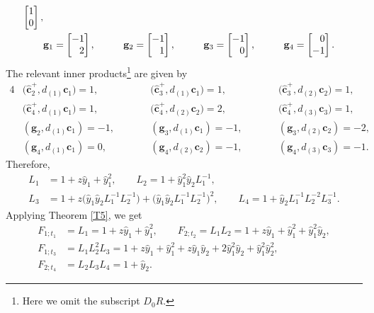\documentclass[10pt,a4paper]{amsart}
\numberwithin{equation}{section}
\begin{document}
\begin{Example}
\begin{alignat*}{5}
\begin{bmatrix}
 1\\0
 \end{bmatrix},&\\
 &\mathbf{g}_{1}=\begin{bmatrix}
 -1\\\hphantom{-}2
 \end{bmatrix},\qquad&&
 \mathbf{g}_{2}=\begin{bmatrix}
 -1\\\hphantom{-}1
 \end{bmatrix},\qquad&&
 \mathbf{g}_{3}=\begin{bmatrix}
 -1\\\hphantom{-}0
 \end{bmatrix},\qquad&&
 \mathbf{g}_{4}=\begin{bmatrix}
 \hphantom{-}0\\-1
 \end{bmatrix}.&
 \end{alignat*}
The relevant inner products\footnote{Here we omit the subscript $D_0R$.} are given by
\begin{alignat*}{4}
&\bigl(\mathbf{\hat{c}}_2^+,d_{(1)}\mathbf{c}_{1}\bigr)=1,\qquad &&\bigl(\mathbf{\hat{c}}_3^+,d_{(1)}\mathbf{c}_{1}\bigr)=1,\qquad && \bigl(\mathbf{\hat{c}}_3^+,d_{(2)}\mathbf{c}_{2}\bigr)=1,&\\
 &\bigl(\mathbf{\hat{c}}_4^+,d_{(1)}\mathbf{c}_{1}\bigr)=1,\qquad&&
 \bigl(\mathbf{\hat{c}}_4^+,d_{(2)}\mathbf{c}_{2}\bigr)=2,\qquad&&
\bigl(\mathbf{\hat{c}}_4^+,d_{(3)}\mathbf{c}_{3}\bigr)=1,&\\
 &(\mathbf{g}_{2},d_{(1)}\mathbf{c}_{1})=-1,\qquad&&
 (\mathbf{g}_{3},d_{(1)}\mathbf{c}_{1})=-1,\qquad&&
 (\mathbf{g}_{3},d_{(2)}\mathbf{c}_{2})=-2,&\\
 &(\mathbf{g}_{4},d_{(1)}\mathbf{c}_{1})=0,\qquad&&
 (\mathbf{g}_{4},d_{(2)}\mathbf{c}_{2})=-1,\qquad&&
 (\mathbf{g}_{4},d_{(3)}\mathbf{c}_{3})=-1.&
 \end{alignat*}
 Therefore,
 \begin{align*}
 L_1&=1+z\hat{y}_1+\hat{y}_1^2,\qquad
 L_2=1+\hat{y}_1^2\hat{y}_2L_1^{-1},\\
 L_3&=1+z\bigl(\hat{y}_1\hat{y}_2L_1^{-1}L_2^{-1}\bigr)+\bigl(\hat{y}_1\hat{y}_2L_1^{-1}L_2^{-1}\bigr)^2,\qquad
 L_4=1+\hat{y}_2L_1^{-1}L_2^{-2}L_{3}^{-1}.
 \end{align*}
 Applying Theorem \ref{T5}, we get
 \begin{align*}
 F_{1;t_1}&=L_1
 =1+z\hat{y}_1+\hat{y}_1^2,\qquad
 F_{2;t_2}=L_1L_2=1+z\hat{y}_1+\hat{y}_1^2+\hat{y}_1^2\hat{y}_2,\\
 F_{1;t_3}&=L_1L_2^2L_3=1+z\hat{y}_1+\hat{y}_1^2+z\hat{y}_1\hat{y}_2+2\hat{y}_1^2\hat{y}_2+\hat{y}_1^2\hat{y}_2^2,\\
 F_{2;t_4}&=L_2L_3L_4
 =1+\hat{y}_2.
\end{align*}
\end{Example}
\end{document}
